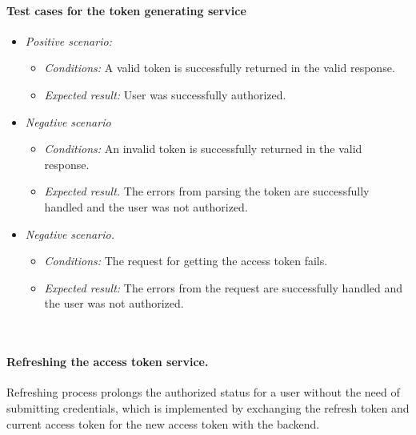 \paragraph*{Test cases for the token generating service} 
\begin{itemize}
    \item \emph{Positive scenario:} 
        \begin{itemize}
            \item \emph{Conditions:} A valid token is successfully returned in the valid response.
            \item \emph{Expected result:} User was successfully authorized.
        \end{itemize}
    \item \emph{Negative scenario} 
        \begin{itemize}
            \item \emph{Conditions:} An invalid token is successfully returned in the valid response.
            \item \emph{Expected result.} The errors from parsing the token are successfully handled and the user was not authorized.
        \end{itemize}
    \item \emph{Negative scenario.} 
        \begin{itemize}
            \item \emph{Conditions:} The request for getting the access token fails.
            \item \emph{Expected result:} The errors from the request are successfully handled and the user was not authorized.
        \end{itemize}
\end{itemize}

\

\paragraph*{Refreshing the access token service.} Refreshing process prolongs the authorized status for a user without the need of submitting credentials, which is implemented by exchanging the refresh token and current access token for the new access token with the backend. 


